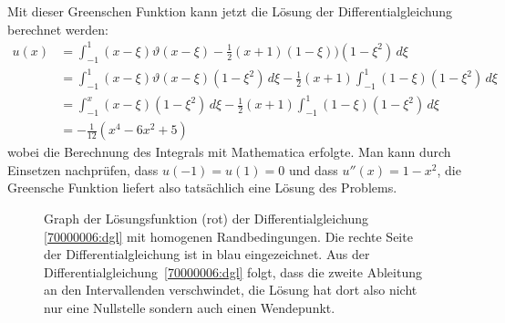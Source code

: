 \begin{loesung}
Mit dieser Greenschen Funktion kann jetzt die Lösung der
Differentialgleichung berechnet werden:
\begin{align*}
u(x)&=\int_{-1}^1
(x-\xi)\vartheta(x-\xi)-{\textstyle\frac12}(x+1)(1-\xi)
)(1-\xi^2)\,d\xi
\\
&=
\int_{-1}^1(x-\xi)\vartheta(x-\xi)(1-\xi^2)\,d\xi
-{\textstyle\frac12}(x+1)\int_{-1}^1(1-\xi)(1-\xi^2)\,d\xi
\\
&=
\int_{-1}^x(x-\xi)(1-\xi^2)\,d\xi
-{\textstyle\frac12}(x+1)\int_{-1}^1(1-\xi)(1-\xi^2)\,d\xi
\\
&=
-\frac1{12}(x^4-6x^2+5)
\end{align*}
wobei die Berechnung des Integrals mit Mathematica erfolgte.
Man kann durch Einsetzen nachprüfen, dass
$u(-1)=u(1)=0$ und dass $u''(x)=1-x^2$, die Greensche Funktion
liefert also tatsächlich eine Lösung des Problems.
\begin{figure}
\centering
{}
\caption{Graph der Lösungsfunktion (rot) der Differentialgleichung
\ref{70000006:dgl}
mit homogenen Randbedingungen.
Die rechte Seite der Differentialgleichung ist in blau eingezeichnet.
Aus der Differentialgleichung~\eqref{70000006:dgl} folgt, dass die zweite
Ableitung an den Intervallenden verschwindet, die Lösung hat dort
also nicht nur eine Nullstelle sondern auch einen Wendepunkt.
\label{70000006:fig}}
\end{figure}


\end{loesung}
